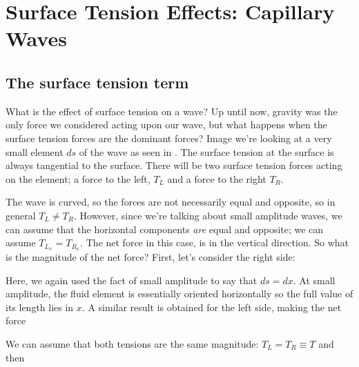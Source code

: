 \documentclass[12pt]{book}
\begin{document}
\section{Surface Tension Effects: Capillary Waves}
\subsection{The surface tension term}
What is the effect of surface tension on a wave?  Up until now, gravity was the only force we considered acting upon our wave, but what happens when the surface tension forces are the dominant forces?  Image we're looking at a very small element $ds$ of the wave as seen in .  The surface tension at the surface is always tangential to the surface.  There will be two surface tension forces acting on the element; a force to the left, $T_L$ and a force to the right $T_R$.




The wave is curved, so the forces are not necessarily equal and opposite, so in general $T_L\ne T_R$. However, since we're talking about small amplitude waves, we can assume that the horizontal components \textit{are} equal and opposite; we can assume $T_{L_x} = T_{R_x}$.  The net force in this case, is in the vertical direction.  So what is the magnitude of the net force? First, let's consider the right side:




Here, we again used the fact of small amplitude to say that $ds = dx$.  At small amplitude, the fluid element is essentially oriented horizontally so the full value of its length lies in $x$.  A similar result is obtained for the left side, making the net force



We can assume that both tensions are the same magnitude: $T_L=T_R\equiv T$ and then
\end{document}
